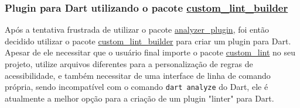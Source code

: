 \subsubsection{Plugin para Dart utilizando o pacote \href{https://pub.dev/packages/custom_lint_builder}{custom\_lint\_builder}}

Após a tentativa frustrada de utilizar o pacote \href{https://pub.dev/packages/analyzer_plugin}{analyzer\_plugin}, foi então decidido utilizar o pacote \href{https://pub.dev/packages/custom_lint_builder}{custom\_lint\_builder} para criar um plugin para Dart. Apesar de ele necessitar que o usuário final importe o pacote \href{https://pub.dev/packages/custom_lint}{custom\_lint} no seu projeto, utilize arquivos diferentes para a personalização de regras de acessibilidade, e também necessitar de uma interface de linha de comando própria, sendo incompatível com o comando \texttt{dart analyze} do Dart, ele é atualmente a melhor opção para a criação de um plugin "linter" para Dart.
